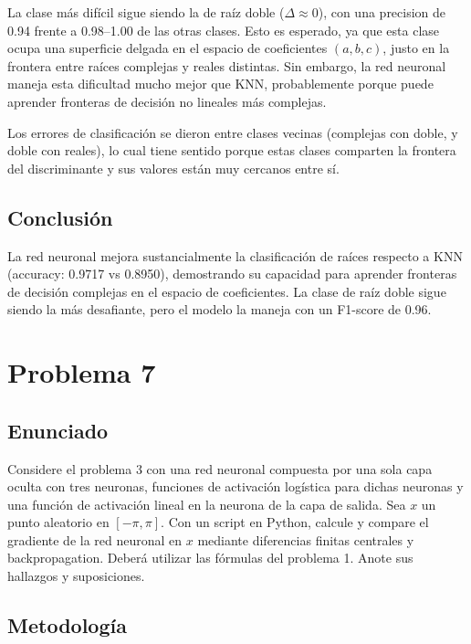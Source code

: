 \documentclass{article}
\begin{document}
La clase más difícil sigue siendo la de raíz doble ($\Delta \approx 0$), con una precision de 0.94 frente a 0.98--1.00 de las otras clases. Esto es esperado, ya que esta clase ocupa una superficie delgada en el espacio de coeficientes $(a, b, c)$, justo en la frontera entre raíces complejas y reales distintas. Sin embargo, la red neuronal maneja esta dificultad mucho mejor que KNN, probablemente porque puede aprender fronteras de decisión no lineales más complejas.

Los errores de clasificación se dieron entre clases vecinas (complejas con doble, y doble con reales), lo cual tiene sentido porque estas clases comparten la frontera del discriminante y sus valores están muy cercanos entre sí.

\subsection{Conclusión}

La red neuronal mejora sustancialmente la clasificación de raíces respecto a KNN (accuracy: 0.9717 vs 0.8950), demostrando su capacidad para aprender fronteras de decisión complejas en el espacio de coeficientes. La clase de raíz doble sigue siendo la más desafiante, pero el modelo la maneja con un F1-score de 0.96.

\section{Problema 7}

\subsection{Enunciado}

Considere el problema 3 con una red neuronal compuesta por una sola capa oculta con tres neuronas, funciones de activación logística para dichas neuronas y una función de activación lineal en la neurona de la capa de salida. Sea $x$ un punto aleatorio en $[-\pi, \pi]$. Con un script en Python, calcule y compare el gradiente de la red neuronal en $x$ mediante diferencias finitas centrales y backpropagation. Deberá utilizar las fórmulas del problema 1. Anote sus hallazgos y suposiciones.

\subsection{Metodología}
\end{document}

